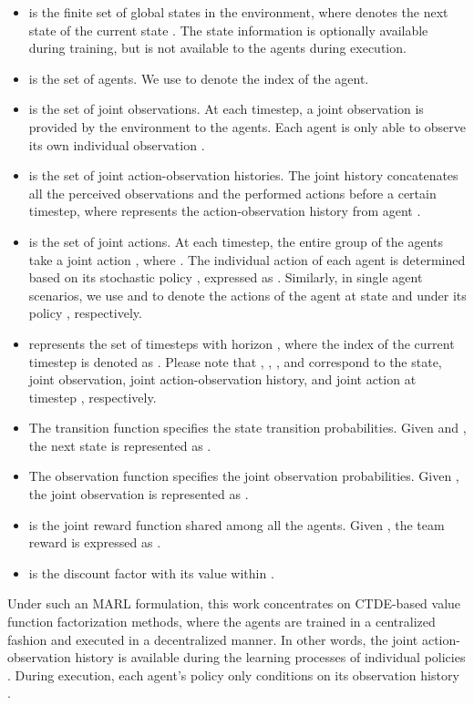 \documentclass[twoside,11pt]{article}
\begin{document}
\begin{itemize}
\setlength\itemsep{0em}

\item  is the finite set of global states in the environment, where  denotes the next state of the current state . The state information is optionally available during training, but is not available to the agents during execution.

\item  is the set of  agents. We use  to denote the index of the agent.

\item  is the set of joint observations. At each timestep, a joint observation  is provided by the environment to the  agents. Each agent  is only able to observe its own individual observation .

\item  is the set of joint action-observation histories. The joint history  concatenates all the perceived observations and the performed actions before a certain timestep, where  represents the action-observation history from agent .

\item  is the set of joint actions. At each timestep, the entire group of the agents take a joint action , where . The individual action  of each agent  is determined based on its stochastic policy , expressed as . Similarly, in single agent scenarios, we use  and  to denote the actions of the agent at state  and  under its policy , respectively.

\item  represents the set of timesteps with horizon , where the index of the current timestep is denoted as . Please note that , , , and  correspond to the state, joint observation, joint action-observation history, and joint action
at timestep , respectively.

\item The transition function  specifies the state transition probabilities. Given  and , the next state is represented as .

\item The observation function  specifies the joint observation probabilities. Given , the joint observation is represented as .

\item  is the joint reward function shared among all the agents. Given , the team reward is expressed as .

\item  is the discount factor with its value within .
\end{itemize}
Under such an MARL formulation, this work concentrates on CTDE-based value function factorization methods, where the agents are trained in a centralized fashion and executed in a decentralized manner. In other words, the joint action-observation history  is available during the learning processes of individual policies . During execution, each agent's policy  only conditions on its observation history .
\end{document}
